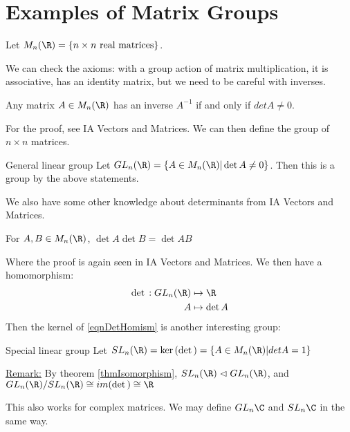 \documentclass[../Main.tex]{subfiles}
\begin{document}
\section{Examples of Matrix Groups}
Let $M_n(\R) = \{n \times n \text{ real matrices}\}$.\par
We can check the axioms: with a group action of matrix multiplication, it is associative, has an identity matrix, but we need to be careful with inverses.
\begin{lemma}
    Any matrix $A \in M_n(\R)$ has an inverse $A^{-1}$ if and only if $det{A} \neq 0$.
\end{lemma}
For the proof, see IA Vectors and Matrices. We can then define the group of $n \times n$ matrices.
\begin{definition}{General linear group}
    Let $GL_n(\R) = \{A \in M_n(\R) | \det{A} \neq 0\}$. Then this is a group by the above statements.
\end{definition}
We also have some other knowledge about determinants from IA Vectors and Matrices.
\begin{lemma}
    For $A, B \in M_n(\R)$, $\det{A} \det{B} = \det{AB}$
\end{lemma}
Where the proof is again seen in IA Vectors and Matrices. We then have a homomorphism:
\begin{align}
    \det{} : GL_n(\R) &\mapsto \R \label{eqnDetHomism} \\
    A &\mapsto \det{A}\nonumber
\end{align}
Then the kernel of \ref{eqnDetHomism} is another interesting group:
\begin{definition}{Special linear group}
    Let $SL_n(\R) = \ker{(\det{})} = \{A \in M_n(\R) | det{A} = 1\}$
\end{definition}
\underline{Remark:} By theorem \ref{thmIsomorphism}, $SL_n(\R) \normalin GL_n(\R)$, and $GL_n(\R)/SL_n(\R) \cong im(\det{}) \cong \R$\par
This also works for complex matrices. We may define $GL_n{\C}$ and $SL_n{\C}$ in the same way.
\end{document}
